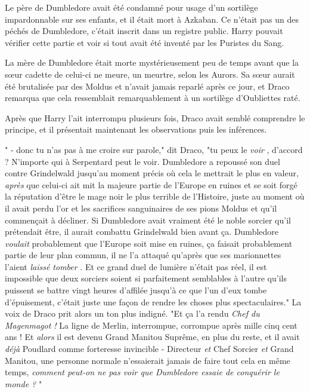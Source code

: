 Le père de Dumbledore avait été condamné pour usage d'un sortilège impardonnable sur ses enfants, et il était mort à Azkaban. Ce n'était pas un des péchés de Dumbledore, c'était inscrit dans un registre public. Harry pouvait vérifier cette partie et voir si tout avait été inventé par les Puristes du Sang.

La mère de Dumbledore était morte mystérieusement peu de temps avant que la sœur cadette de celui-ci ne meure, un meurtre, selon les Aurors. Sa sœur aurait été brutalisée par des Moldus et n'avait jamais reparlé après ce jour, et Draco remarqua que cela ressemblait remarquablement à un sortilège d'Oubliettes raté.

Après que Harry l'ait interrompu plusieurs fois, Draco avait semblé comprendre le principe, et il présentait maintenant les observations puis les inférences.

" - donc tu n'as pas à me croire sur parole," dit Draco, "tu peux le \emph{voir} , d'accord ? N'importe qui à Serpentard peut le voir. Dumbledore a repoussé son duel contre Grindelwald jusqu'au moment précis où cela le mettrait le plus en valeur, \emph{après}  que celui-ci ait mit la majeure partie de l'Europe en ruines et se soit forgé la réputation d'être le mage noir le plus terrible de l'Histoire, juste au moment où il avait perdu l'or et les sacrifices sanguinaires de ses pions Moldus et qu'il commençait à décliner. Si Dumbledore avait vraiment été le noble sorcier qu'il prétendait être, il aurait combattu Grindelwald bien avant ça. Dumbledore \emph{voulait}  probablement que l'Europe soit mise en ruines, ça faisait probablement partie de leur plan commun, il ne l'a attaqué qu'après que ses marionnettes l'aient \emph{laissé tomber} . Et ce grand duel de lumière n'était pas réel, il est impossible que deux sorciers soient si parfaitement semblables à l'autre qu'ils puissent se battre vingt heures d'affilée jusqu'à ce que l'un d'eux tombe d'épuisement, c'était juste une façon de rendre les choses plus spectaculaires." La voix de Draco prit alors un ton plus indigné. "Et ça l'a rendu \emph{Chef du Magenmagot !}  La ligne de Merlin, interrompue, corrompue après mille cinq cent ans ! Et \emph{alors}  il est devenu Grand Manitou Suprême, en plus du reste, et il avait \emph{déjà}  Poudlard comme forteresse invincible - Directeur \emph{et}  Chef Sorcier \emph{et}  Grand Manitou, une personne normale n'essaierait jamais de faire tout cela en même temps, \emph{comment peut-on ne pas voir que Dumbledore essaie de conquérir le monde ?} "

